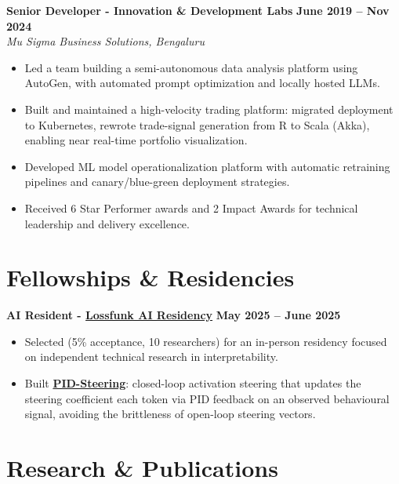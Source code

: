 \documentclass[11pt,a4paper]{article}
\newcommand{\entrygap}{\vspace{8pt}}
\begin{document}
\entrygap
\textbf{Senior Developer - Innovation \& Development Labs} \hfill \textbf{June 2019 -- Nov 2024} \\
\textit{Mu Sigma Business Solutions, Bengaluru}
\begin{itemize}[leftmargin=*, nosep]
\item Led a team building a semi-autonomous data analysis platform using AutoGen, with automated prompt optimization and  locally hosted LLMs.
\item Built and maintained a high-velocity trading platform: migrated deployment to Kubernetes, rewrote trade-signal generation from R to Scala (Akka), enabling near real-time portfolio visualization.
\item Developed ML model operationalization platform with automatic retraining pipelines and canary/blue-green deployment strategies.
\item Received 6 Star Performer awards and 2 Impact Awards for technical leadership and delivery excellence.
\end{itemize}

\section{Fellowships \& Residencies}

\textbf{AI Resident - \href{https://lossfunk.com/residency/}{Lossfunk AI Residency}} \hfill \textbf{May 2025 -- June 2025}
\begin{itemize}[leftmargin=*, nosep]
\item Selected (5\% acceptance, 10 researchers) for an in-person residency focused on independent technical research in interpretability.
\item Built \href{https://github.com/arbdwj/pid_steering}{\textbf{PID-Steering}}: closed-loop activation steering that updates the steering coefficient each token via PID feedback on an observed behavioural signal, avoiding the brittleness of open-loop steering vectors.
\end{itemize}
\section{Research \& Publications}
\end{document}
